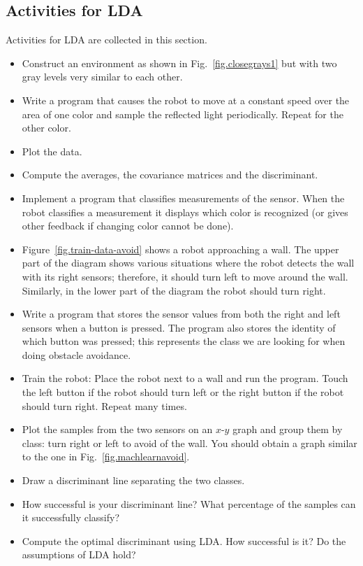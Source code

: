\subsection{Activities for LDA}

Activities for LDA are collected in this section.

\begin{framed}
\begin{itemize}
\item Construct an environment as shown in Fig.~\ref{fig.closegrays1} but with two gray levels very similar to each other.
\item Write a program that causes the robot to move at a constant speed over the area of one color and sample the reflected light periodically. Repeat for the other color.
\item Plot the data.
\item Compute the averages, the covariance matrices and the discriminant. 
\item Implement a program that classifies measurements of the sensor. When the robot classifies a measurement it displays which color is recognized (or gives other feedback if changing color cannot be done).
\end{itemize}
\end{framed}

\begin{framed}
\begin{itemize}
\item Figure~\ref{fig.train-data-avoid} shows a robot approaching a wall. The upper part of the diagram shows various situations where the robot detects the wall with its right sensors; therefore, it should turn left to move around the wall. Similarly, in the lower part of the diagram the robot should turn right.
\item Write a program that stores the sensor values from both the right and left sensors when a button is pressed. The program also stores the identity of which button was pressed; this represents the class we are looking for when doing obstacle avoidance.
\item Train the robot: Place the robot next to a wall and run the program. Touch the left button if the robot should turn left or the right button if the robot should turn right. Repeat many times.
\item Plot the samples from the two sensors on an $x$-$y$ graph and group them by class: turn right or left to avoid of the wall. You should obtain a graph similar to the one in Fig.~\ref{fig.machlearnavoid}.
\item Draw a discriminant line separating the two classes.
\item How successful is your discriminant line? What percentage of the samples can it successfully classify?
\item Compute the optimal discriminant using LDA. How successful is it? Do the assumptions of LDA hold?
\end{itemize}
\end{framed}

